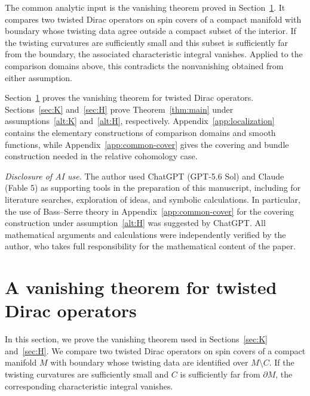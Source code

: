 \documentclass[12pt,reqno]{amsart}
\numberwithin{equation}{section}
\theoremstyle{definition}
\begin{document}
The common analytic input is the vanishing theorem proved in
Section~\ref{sec:analytic}.  It compares two twisted Dirac operators
on spin covers of a compact manifold with boundary whose twisting
data agree outside a compact subset of the interior.  If the twisting
curvatures are sufficiently small and this subset is sufficiently far
from the boundary, the associated characteristic integral vanishes.
Applied to the comparison domains above, this contradicts the
nonvanishing obtained from either assumption.



Section~\ref{sec:analytic} proves the vanishing theorem for twisted
Dirac operators.  Sections~\ref{sec:K} and~\ref{sec:H} prove
Theorem~\ref{thm:main} under assumptions~\ref{alt:K} and~\ref{alt:H},
respectively.  Appendix~\ref{app:localization} contains the elementary
constructions of comparison domains and smooth functions, while
Appendix~\ref{app:common-cover} gives the covering and bundle
construction needed in the relative cohomology case.

\textit{Disclosure of AI use.}
The author used ChatGPT (GPT-5.6 Sol) and Claude (Fable 5) as supporting
tools in the preparation of this manuscript, including for literature
searches, exploration of ideas, and symbolic calculations.
In particular, the use of Bass--Serre theory in Appendix~\ref{app:common-cover}
for the covering construction under assumption~\ref{alt:H} was suggested
by ChatGPT.  All mathematical arguments and calculations
were independently verified by the author, who takes full responsibility
for the mathematical content of the paper.



\vspace{0.5cm}

\section{A vanishing theorem for twisted Dirac operators}\label{sec:analytic}

In this section, we prove the vanishing theorem used in
Sections~\ref{sec:K} and~\ref{sec:H}.  We compare two twisted Dirac
operators on spin covers of a compact manifold $M$ with boundary whose
twisting data are identified over $M\setminus C$.  If the twisting
curvatures are sufficiently small and $C$ is sufficiently far from
$\partial M$, the corresponding characteristic integral vanishes.
\end{document}
